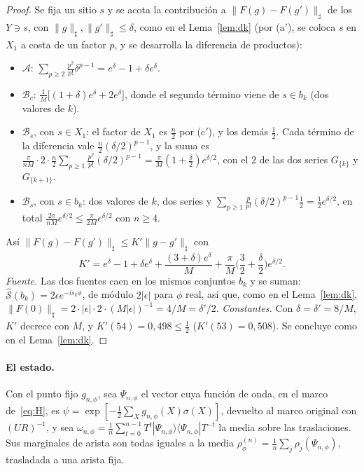\documentclass[11pt,a4paper]{article}
\theoremstyle{remark}
\newcommand{\ket}[1]{|#1\rangle}
\newcommand{\bra}[1]{\langle #1|}
\begin{document}
\begin{proof}
Se fija un sitio $s$ y se acota la contribución a $\|F(g)-F(g')\|_\sharp$ de los $Y\ni s$, con
$\|g\|_\sharp,\|g'\|_\sharp\le\delta$, como en el Lema~\ref{lem:dk} (por (a$'$), se coloca $s$ en $X_1$ a
costa de un factor $p$, y se desarrolla la diferencia de productos):
\begin{itemize}
\item $\mathcal A$: $\sum_{p\ge2}\frac{p^2}{p!}\delta^{p-1}=e^\delta-1+\delta e^\delta$.
\item $\mathcal B_c$: $\frac1M\big[(1+\delta)e^\delta+2e^\delta\big]$, donde el segundo término viene de
  $s\in b_k$ (dos valores de $k$).
\item $\mathcal B_s$, con $s\in X_1$: el factor de $X_1$ es $\tfrac n2$ por (c$'$), y los demás
  $\tfrac12$. Cada término de la diferencia vale $\tfrac n2(\delta/2)^{p-1}$, y la suma es
  $\frac{\pi}{nM}\cdot2\cdot\frac n2\sum_{p\ge1}\frac{p^2}{p!}(\delta/2)^{p-1}=\frac\pi M(1+\tfrac\delta2)e^{\delta/2}$,
  con el $2$ de las dos series $G_{\{k\}}$ y $G_{\{k+1\}}$.
\item $\mathcal B_s$, con $s\in b_k$: dos valores de $k$, dos series y
  $\sum_{p\ge1}\frac p{p!}(\delta/2)^{p-1}\tfrac12=\tfrac12e^{\delta/2}$, en total
  $\frac{2\pi}{nM}e^{\delta/2}\le\frac\pi{2M}e^{\delta/2}$ con $n\ge4$.
\end{itemize}
Así $\|F(g)-F(g')\|_\sharp\le K'\|g-g'\|_\sharp$ con
\[
  K'=e^\delta-1+\delta e^\delta+\frac{(3+\delta)e^\delta}M+\frac\pi M\Big(\frac32+\frac\delta2\Big)e^{\delta/2}.
\]
\emph{Fuente.} Las dos fuentes caen en los mismos conjuntos $b_k$ y se suman: $\widehat{\mathcal S}(b_k)=
2\epsilon e^{-is_k\phi}$, de módulo $2|\epsilon|$ para $\phi$ real, así que, como en el Lema~\ref{lem:dk},
$\|F(0)\|_\sharp=2\cdot|\epsilon|\cdot2\cdot(M|\epsilon|)^{-1}=4/M=\delta'/2$.
\emph{Constantes.} Con $\delta=\delta'=8/M$, $K'$ decrece con $M$, y $K'(54)=0{,}498\le\tfrac12$
($K'(53)=0{,}508$). Se concluye como en el Lema~\ref{lem:dk}.
\end{proof}

\paragraph{El estado.} Con el punto fijo $g_{n,\phi}$, sea $\Psi_{n,\phi}$ el vector cuya función de onda,
en el marco de~\eqref{eq:H}, es $\psi=\exp[-\tfrac12\sum_Xg_{n,\phi}(X)\sigma(X)]$, devuelto al marco
original con $(UR)^{-1}$, y sea $\omega_{n,\phi}=\frac1n\sum_{t=0}^{n-1}T^t\ket{\Psi_{n,\phi}}\bra{\Psi_{n,\phi}}T^{-t}$
la media sobre las traslaciones. Sus marginales de arista son todas iguales a la media
$\rho^{(n)}_\phi=\frac1n\sum_j\rho_j(\Psi_{n,\phi})$, trasladada a una arista fija.
\end{document}
